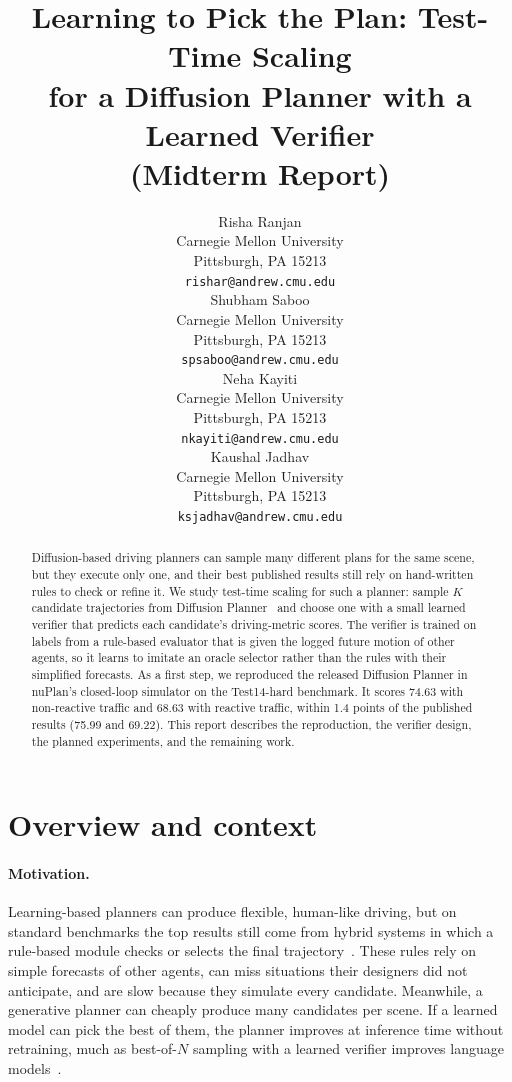\documentclass{article}
\title{Learning to Pick the Plan: Test-Time Scaling\\for a Diffusion Planner with a Learned Verifier\\(Midterm Report)}
\author{%
  Risha Ranjan \\
  Carnegie Mellon University\\
  Pittsburgh, PA 15213 \\
  \texttt{rishar@andrew.cmu.edu} \\
  \And
  Shubham Saboo \\
  Carnegie Mellon University\\
  Pittsburgh, PA 15213 \\
  \texttt{spsaboo@andrew.cmu.edu} \\
  \AND
  Neha Kayiti \\
  Carnegie Mellon University\\
  Pittsburgh, PA 15213 \\
  \texttt{nkayiti@andrew.cmu.edu} \\
  \And
  Kaushal Jadhav \\
  Carnegie Mellon University\\
  Pittsburgh, PA 15213 \\
  \texttt{ksjadhav@andrew.cmu.edu} \\
}
\begin{document}
\maketitle

\begin{abstract}
Diffusion-based driving planners can sample many different plans for the same scene, but they execute only one, and their best published results still rely on hand-written rules to check or refine it. We study test-time scaling for such a planner: sample $K$ candidate trajectories from Diffusion Planner~\cite{zheng2025diffusion} and choose one with a small learned verifier that predicts each candidate's driving-metric scores. The verifier is trained on labels from a rule-based evaluator that is given the logged future motion of other agents, so it learns to imitate an oracle selector rather than the rules with their simplified forecasts. As a first step, we reproduced the released Diffusion Planner in nuPlan's closed-loop simulator on the Test14-hard benchmark. It scores 74.63 with non-reactive traffic and 68.63 with reactive traffic, within 1.4 points of the published results (75.99 and 69.22). This report describes the reproduction, the verifier design, the planned experiments, and the remaining work.
\end{abstract}

\section{Overview and context}

\paragraph{Motivation.}
Learning-based planners can produce flexible, human-like driving, but on standard benchmarks the top results still come from hybrid systems in which a rule-based module checks or selects the final trajectory~\cite{zheng2025diffusion,cheng2024pluto}. These rules rely on simple forecasts of other agents, can miss situations their designers did not anticipate, and are slow because they simulate every candidate. Meanwhile, a generative planner can cheaply produce many candidates per scene. If a learned model can pick the best of them, the planner improves at inference time without retraining, much as best-of-$N$ sampling with a learned verifier improves language models~\cite{cobbe2021verifiers}.
\end{document}
